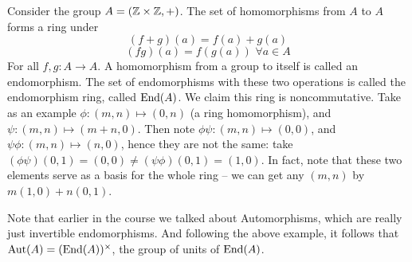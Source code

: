 \begin{example}
  Consider the group $A=(\mathbb Z\times\mathbb Z, +)$. The set of
  homomorphisms from $A$ to $A$ forms a ring under 
  \[(f+g)(a)= f(a)+g(a)\]
  \[(fg)(a) = f(g(a)) \, \, \forall a\in A\]
  For all $f,g:A\to A$. A homomorphism from a group to itself is called an
  endomorphism. The set of endomorphisms with these two operations is called the
  endomorphism ring, called $\operatorname{End}(A)$. We claim this ring is noncommutative. Take as
  an example $\phi:(m,n)\mapsto (0,n)$ (a ring homomorphism), and $\psi:(m,n)\mapsto
  (m+n,0)$. Then note $\phi\psi:(m,n)\mapsto (0,0)$, and $\psi\phi:(m,n)\mapsto (n,0)$,
  hence they are not the same: take $(\phi\psi)(0,1)=(0,0)\neq
  (\psi\phi)(0,1)=(1,0)$. In fact, note that these two elements serve as a basis for the
  whole ring -- we can get any $(m,n)$ by $m(1,0)+n(0,1)$.
\end{example}

Note that earlier in the course we talked about Automorphisms, which are really just
invertible endomorphisms. And following the above example, it follows that
$\operatorname{Aut}(A)=(\operatorname{End}(A))^{\times}$, the group of units of $\operatorname{End}(A)$.
